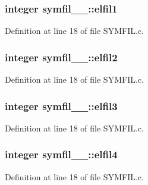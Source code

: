 \subsubsection[{\texorpdfstring{elfil1}{elfil1}}]{\setlength{\rightskip}{0pt plus 5cm}integer symfil\+\_\+\_\+\+::elfil1}\hypertarget{structsymfil__1___a8608696d9e927d49afe7c2e6cc371824}{}\label{structsymfil__1___a8608696d9e927d49afe7c2e6cc371824}


Definition at line 18 of file S\+Y\+M\+F\+I\+L.\+c.

\subsubsection[{\texorpdfstring{elfil2}{elfil2}}]{\setlength{\rightskip}{0pt plus 5cm}integer symfil\+\_\+\_\+\+::elfil2}\hypertarget{structsymfil__1___abce64f97383f4f3ea1298b7207619964}{}\label{structsymfil__1___abce64f97383f4f3ea1298b7207619964}


Definition at line 18 of file S\+Y\+M\+F\+I\+L.\+c.

\subsubsection[{\texorpdfstring{elfil3}{elfil3}}]{\setlength{\rightskip}{0pt plus 5cm}integer symfil\+\_\+\_\+\+::elfil3}\hypertarget{structsymfil__1___a8b6348b2bc812d0e7e067f3b51725de8}{}\label{structsymfil__1___a8b6348b2bc812d0e7e067f3b51725de8}


Definition at line 18 of file S\+Y\+M\+F\+I\+L.\+c.

\subsubsection[{\texorpdfstring{elfil4}{elfil4}}]{\setlength{\rightskip}{0pt plus 5cm}integer symfil\+\_\+\_\+\+::elfil4}\hypertarget{structsymfil__1___a4954b7af926c97dcbb482f83bb2ffc66}{}\label{structsymfil__1___a4954b7af926c97dcbb482f83bb2ffc66}


Definition at line 18 of file S\+Y\+M\+F\+I\+L.\+c.

